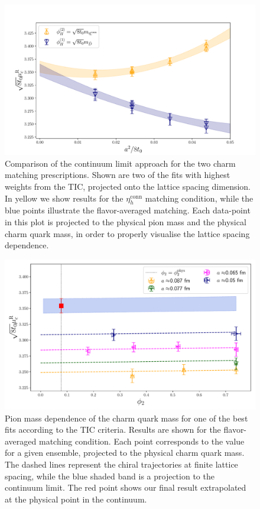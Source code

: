 \begin{figure}
	\centering 
	\includegraphics[scale=0.45]{./cap6/figs/mc/mc_cl_all_cat.pdf}
	\caption{Comparison of the continuum limit approach for the two  charm matching 
	prescriptions. Shown are two of the fits with highest weights from the TIC, projected onto the lattice 
	spacing dimension. In yellow we show results for the $\eta_h^{\mathrm{conn}}$ matching condition, while  the blue 
	points illustrate  the flavor-averaged matching. Each data-point in this plot is projected to the 
	physical pion mass and the physical charm quark mass, in order to properly visualise the lattice 
	spacing dependence. }
	\label{fig:mc_continuum_limit}
\end{figure}

\begin{figure}
	\centering
	\includegraphics[scale=0.42]{./cap6/figs/mc/fit_phi2_muc_fl_ave.pdf}
	\caption{Pion mass dependence of the charm quark mass for one of the best  fits according to the TIC criteria. Results are shown for the flavor-averaged matching condition. Each point corresponds to the  value for a given ensemble, projected to the physical charm quark mass. The dashed lines represent the chiral trajectories at finite lattice spacing, while the blue shaded band is a projection to the continuum limit. The red point shows our final result extrapolated at the physical point in the continuum. }
	\label{fig:mc_pion_dependence}
\end{figure}


